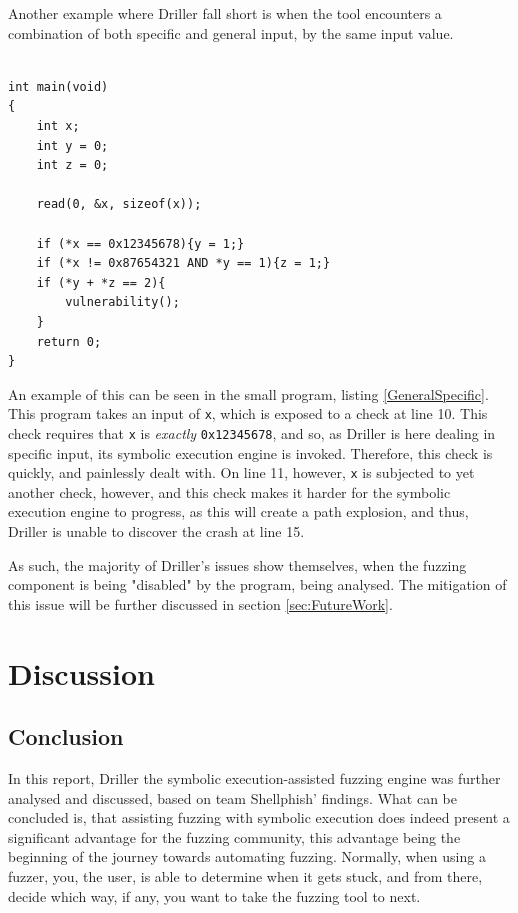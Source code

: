 \documentclass[a4paper]{article}
\newcommand{\tit}[1]{\textit{#1}}
\newcommand{\ttt}[1]{\texttt{#1}}
\begin{document}
Another example where Driller fall short is when the tool encounters a combination of both specific and general input, by the same input value. 
\begin{lstlisting}[caption=An example of Driller being outmanoeuvred by specific and general input,
label=GeneralSpecific, captionpos=b]

int main(void)
{
    int x;
    int y = 0;
    int z = 0;

    read(0, &x, sizeof(x));
    
    if (*x == 0x12345678){y = 1;}
    if (*x != 0x87654321 AND *y == 1){z = 1;}
    if (*y + *z == 2){
        vulnerability();
    }
    return 0;
}
\end{lstlisting}
An example of this can be seen in the small program, listing \ref{GeneralSpecific}. This program takes an input of \ttt{x}, which is exposed to a check at line 10. This check requires that \ttt{x} is \tit{exactly} \ttt{0x12345678}, and so, as Driller is here dealing in specific input, its symbolic execution engine is invoked. Therefore, this check is quickly, and painlessly dealt with. On line 11, however, \ttt{x} is subjected to yet another check, however, and this check makes it harder for the symbolic execution engine to progress, as this will create a path explosion, and thus, Driller is unable to discover the crash at line 15.

As such, the majority of Driller's issues show themselves, when the fuzzing component is being "disabled" by the program, being analysed. The mitigation of this issue will be further discussed in section \ref{sec:FutureWork}.
\section{Discussion}
\label{sec:Discussion}
\subsection{Conclusion}
\label{sec:Conclusion}
In this report, Driller the symbolic execution-assisted fuzzing engine was further analysed and discussed, based on team Shellphish' findings. What can be concluded is, that assisting fuzzing with symbolic execution does indeed present a significant advantage for the fuzzing community, this advantage being the beginning of the journey towards automating fuzzing. Normally, when using a fuzzer, you, the user, is able to determine when it gets stuck, and from there, decide which way, if any, you want to take the fuzzing tool to next. 
\end{document}
